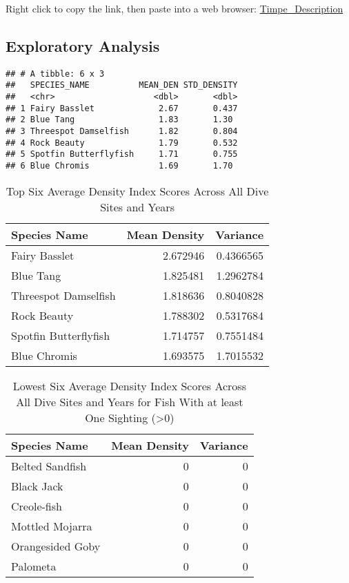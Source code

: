 \documentclass[
]{article}
\begin{document}
Right click to copy the link, then paste into a web browser:
\href{file:///Users/adam.bruce/Desktop/IS_CAPSTONE/TIMPE_DESCRIPTION.pdf}{Timpe\_Description}

\hypertarget{exploratory-analysis}{%
\subsection{Exploratory Analysis}\label{exploratory-analysis}}

\begin{verbatim}
## # A tibble: 6 x 3
##   SPECIES_NAME          MEAN_DEN STD_DENSITY
##   <chr>                    <dbl>       <dbl>
## 1 Fairy Basslet             2.67       0.437
## 2 Blue Tang                 1.83       1.30 
## 3 Threespot Damselfish      1.82       0.804
## 4 Rock Beauty               1.79       0.532
## 5 Spotfin Butterflyfish     1.71       0.755
## 6 Blue Chromis              1.69       1.70
\end{verbatim}

\begin{table}

\caption{\label{tab:unnamed-chunk-3}Top Six Average Density Index Scores Across All Dive Sites and Years}
\centering
\begin{tabular}[t]{lrr}
\toprule
Species Name & Mean Density & Variance\\
\midrule
Fairy Basslet & 2.672946 & 0.4366565\\
Blue Tang & 1.825481 & 1.2962784\\
Threespot Damselfish & 1.818636 & 0.8040828\\
Rock Beauty & 1.788302 & 0.5317684\\
Spotfin Butterflyfish & 1.714757 & 0.7551484\\
\addlinespace
Blue Chromis & 1.693575 & 1.7015532\\
\bottomrule
\end{tabular}
\end{table}

\begin{table}

\caption{\label{tab:unnamed-chunk-4}Lowest Six Average Density Index Scores Across All Dive Sites and Years for Fish With at least One Sighting (>0)}
\centering
\begin{tabular}[t]{lrr}
\toprule
Species Name & Mean Density & Variance\\
\midrule
Belted Sandfish & 0 & 0\\
Black Jack & 0 & 0\\
Creole-fish & 0 & 0\\
Mottled Mojarra & 0 & 0\\
Orangesided Goby & 0 & 0\\
\addlinespace
Palometa & 0 & 0\\
\bottomrule
\end{tabular}
\end{table}
\end{document}
